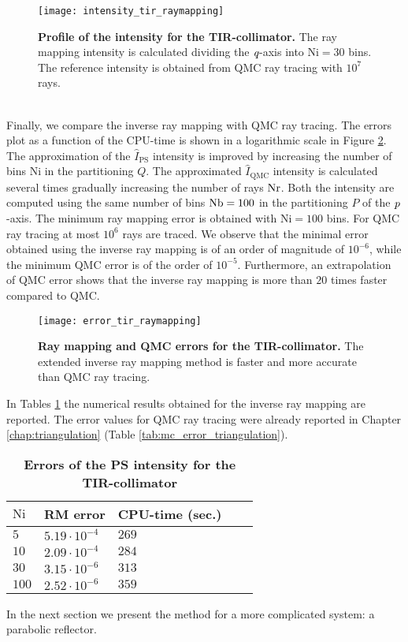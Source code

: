 \begin{figure}[t]
  \begin{center}
  \texttt{[image: intensity\_tir\_raymapping]}
  \end{center}
  \caption{\textbf{Profile of the intensity for the TIR-collimator.}
 The ray mapping intensity is calculated dividing the $\textit{q}$-axis into $\textrm{Ni}=30$ bins. The reference intensity is obtained from QMC ray tracing with $10^7$ rays.}
\label{fig:intensity_tir_raymapping}
 \end{figure}
\\ \indent 
Finally, we compare the inverse ray mapping with QMC ray tracing. The errors plot as a function of the CPU-time is shown in a logarithmic scale in Figure \ref{fig:error_tir_raymapping}. The approximation of the $\hat{I}_{\textrm{PS}}$ intensity is improved by increasing the number of bins $\textrm{Ni}$ in the partitioning $Q$. The approximated $\hat{I}_{\textrm{QMC}}$ intensity is calculated several times gradually increasing the number of rays $\textrm{Nr}$. Both the intensity are computed using the same number of bins $\textrm{Nb}=100$ in the partitioning $P$ of the $\textit{p}$-axis. The minimum ray mapping error is obtained with $\textrm{Ni}=100$ bins. For QMC ray tracing at most $10^6$ rays are traced. We observe that the minimal error obtained using the inverse ray mapping is of an order of magnitude of $10^{-6}$, while the minimum QMC error is of the order of $10^{-5}$. Furthermore, an extrapolation of QMC error shows that the inverse ray mapping is more than $20$ times faster compared to QMC.
\begin{figure}[t]
  \begin{center}
  \texttt{[image: error\_tir\_raymapping]}
  \end{center}
  \caption{\textbf{Ray mapping and QMC errors for the TIR-collimator.}
 The extended inverse ray mapping method is faster and more accurate than QMC ray tracing.}
\label{fig:error_tir_raymapping}
 \end{figure}
In Tables \ref{tab:ray_mapping_tir} the numerical results obtained for the inverse ray mapping are reported. The error values for QMC ray tracing were already reported in Chapter \ref{chap:triangulation} (Table \ref{tab:mc_error_triangulation}).

\begin{table}[t] 
\centering
\caption{\bf Errors of the PS intensity for the TIR-collimator}
\begin{tabular}{lllll}
 \hline  $\textrm{Ni}$\;  & RM error  & CPU-time (sec.)\\
  \hline 
 $5$   & $5.19\cdot10^{-4}$    & $269$  \\
$10$    & $2.09\cdot 10^{-4}$   & $284$   \\
$30$    & $3.15\cdot 10^{-6}$   & $313$  \\
 $100$   & $2.52\cdot 10^{-6}$   & $359$  \\
 \hline
 \end{tabular}
 \label{tab:ray_mapping_tir}
 \end{table}
In the next section we present the method for a more complicated system: a parabolic reflector.
